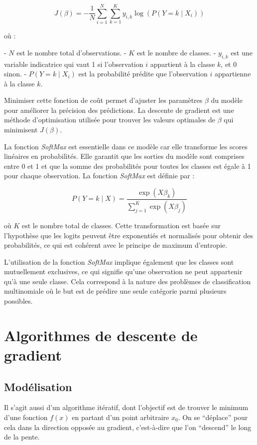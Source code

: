 \documentclass[10pt,french]{report}
\begin{document}
	\[
	J(\beta) = -\frac{1}{N} \sum_{i=1}^{N} \sum_{k=1}^{K} y_{i,k} \log\left( P(Y = k \mid X_i) \right)
	\]

	où :

	- \( N \) est le nombre total d'observations.
	- \( K \) est le nombre de classes.
	- \( y_{i,k} \) est une variable indicatrice qui vaut 1 si l'observation \( i \) appartient à la classe \( k \), et 0 sinon.
	- \( P(Y = k \mid X_i) \) est la probabilité prédite que l'observation \( i \) appartienne à la classe \( k \).

	Minimiser cette fonction de coût permet d'ajuster les paramètres \( \beta \) du modèle pour améliorer la précision des prédictions. La descente de gradient est une méthode d'optimisation utilisée pour trouver les valeurs optimales de \( \beta \) qui minimisent \( J(\beta) \).

	La fonction \textit{SoftMax} est essentielle dans ce modèle car elle transforme les scores linéaires en probabilités. Elle garantit que les sorties du modèle sont comprises entre 0 et 1 et que la somme des probabilités pour toutes les classes est égale à 1 pour chaque observation. La fonction \textit{SoftMax} est définie par :

	\[
	P(Y = k \mid X) = \frac{\exp(X\beta_k)}{\sum_{j=1}^K \exp(X\beta_j)}
	\]

	où \( K \) est le nombre total de classes. Cette transformation est basée sur l'hypothèse que les logits peuvent être exponentiés et normalisés pour obtenir des probabilités, ce qui est cohérent avec le principe de maximum d'entropie.

	L'utilisation de la fonction \textit{SoftMax} implique également que les classes sont mutuellement exclusives, ce qui signifie qu'une observation ne peut appartenir qu'à une seule classe. Cela correspond à la nature des problèmes de classification multinomiale où le but est de prédire une seule catégorie parmi plusieurs possibles.

	\section{Algorithmes de descente de gradient}

	\subsection{Modélisation}

    Il s'agit aussi d'un algorithme itératif, dont l'objectif est de trouver le minimum d'une fonction $f\left(x\right)$ en partant d'un point arbitraire $x_0$. On se \enquote{déplace} pour cela dans la direction opposée au gradient, c'est-à-dire que l'on \enquote{descend} le long de la pente.
\end{document}
